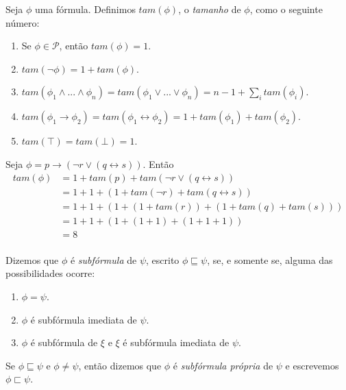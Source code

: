 \begin{definition}
	Seja $\phi$ uma fórmula. Definimos $tam(\phi)$, o \emph{tamanho} de $\phi$, como o seguinte número:
	\begin{enumerate}
		\item Se $\phi \in \mathcal{P}$, então $tam(\phi) = 1$.
		\item $tam(\neg \phi) = 1 + tam(\phi)$.
		\item $tam(\phi_1 \wedge ... \wedge \phi_n) = tam(\phi_1 \vee ... \vee \phi_n) = n - 1 + \sum_i tam(\phi_i)$.
		\item $tam(\phi_1 \rightarrow \phi_2) = tam(\phi_1 \leftrightarrow \phi_2) = 1 + tam(\phi_1) + tam(\phi_2)$.
		\item $tam(\top) = tam(\bot) = 1$.
	\end{enumerate}
\end{definition}

\begin{example}
	Seja $\phi = p \rightarrow (\neg r \vee (q \leftrightarrow s))$. Então
	\begin{equation*}
	\begin{split}
	tam(\phi) & = 1 + tam(p) + tam(\neg r \vee (q \leftrightarrow s))\\
	& = 1 + 1 + (1 + tam(\neg r) + tam(q \leftrightarrow s))\\
	& = 1 + 1 + (1 + (1 + tam(r)) + (1 + tam(q) + tam(s)))\\
	& = 1 + 1 + (1 + (1 + 1) + (1 + 1 + 1))\\
	& = 8\\
	\end{split}
	\end{equation*}
\end{example}

\begin{definition}
	Dizemos que $\phi$ é \emph{subfórmula} de $\psi$, escrito $\phi \sqsubseteq \psi$, se, e somente se, alguma das possibilidades ocorre:
	\begin{enumerate}
		\item $\phi = \psi$.
		\item $\phi$ é subfórmula imediata de $\psi$.
		\item $\phi$ é subfórmula de $\xi$ e $\xi$ é subfórmula imediata de $\psi$.
	\end{enumerate}
	
	Se $\phi \sqsubseteq \psi$ e $\phi \neq \psi$, então dizemos que $\phi$ é \emph{subfórmula própria} de $\psi$ e escrevemos $\phi \sqsubset \psi$.
\end{definition}

